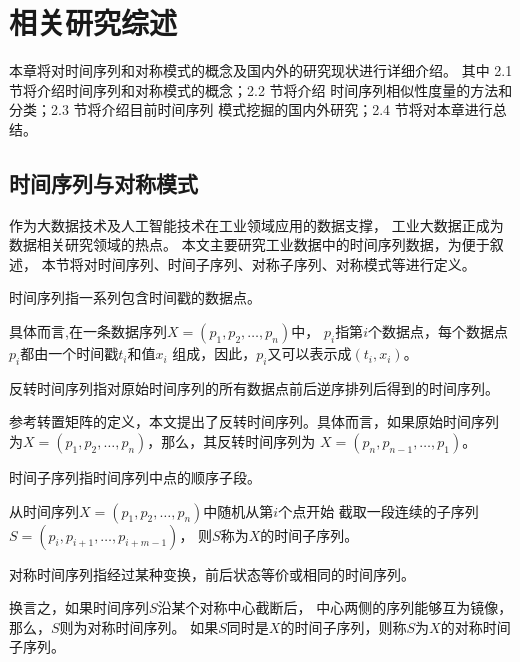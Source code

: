 
\chapter{相关研究综述}
本章将对时间序列和对称模式的概念及国内外的研究现状进行详细介绍。
其中 2.1 节将介绍时间序列和对称模式的概念；2.2 节将介绍
时间序列相似性度量的方法和分类；2.3 节将介绍目前时间序列
模式挖掘的国内外研究；2.4 节将对本章进行总结。

\section{时间序列与对称模式}
作为大数据技术及人工智能技术在工业领域应用的数据支撑，
工业大数据正成为数据相关研究领域的热点。
本文主要研究工业数据中的时间序列数据，为便于叙述，
本节将对时间序列、时间子序列、对称子序列、对称模式等进行定义。

\begin{definition}
  时间序列指一系列包含时间戳的数据点。

  具体而言,在一条数据序列$X = \left( p_1,p_2,\dots,p_n \right)$中，
  $p_i$指第$i$个数据点，每个数据点$p_i$都由一个时间戳$t_i$和值$x_i$
  组成，因此，$p_i$又可以表示成$\left( t_i,x_i \right)$。
\end{definition}

\begin{definition}
  反转时间序列指对原始时间序列的所有数据点前后逆序排列后得到的时间序列。

  参考转置矩阵的定义，本文提出了反转时间序列。具体而言，如果原始时间序列
  为$X = \left( p_1,p_2,\dots,p_n \right)$，那么，其反转时间序列为
  $X = \left( p_n,p_{n-1},\dots,p_1 \right)$。
\end{definition}

\begin{definition}
  时间子序列指时间序列中点的顺序子段。

  从时间序列$X=\left( p_1,p_2,\dots,p_n \right)$中随机从第$i$个点开始
  截取一段连续的子序列$S = \left( p_i,p_{i+1},\dots,p_{i+m-1} \right)$，
  则$S$称为$X$的时间子序列。 
\end{definition}

\begin{definition}
  对称时间序列指经过某种变换，前后状态等价或相同的时间序列。

  换言之，如果时间序列$S$沿某个对称中心截断后，
  中心两侧的序列能够互为镜像，那么，$S$则为对称时间序列。
  如果$S$同时是$X$的时间子序列，则称$S$为$X$的对称时间子序列。
\end{definition}

